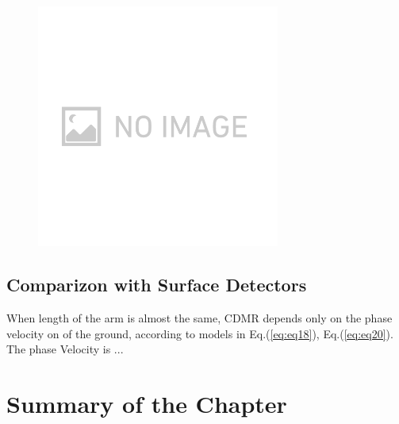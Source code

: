 \documentclass[a4paper,12pt]{book}
\begin{document}
\begin{figure}[H]
  \begin{center}
    \includegraphics[width=8cm]{./img_no_image.png}
  \end{center}
  \caption{}
  \label{img:img_seismometer_map}
\end{figure}



\subsection{Comparizon with Surface Detectors}
When length of the arm is almost the same, CDMR depends only on the phase velocity on of the ground, according to models in Eq.(\ref{eq:eq18}), Eq.(\ref{eq:eq20}). The phase Velocity is ...



\section{Summary of the Chapter}

\appendix


\end{document}
